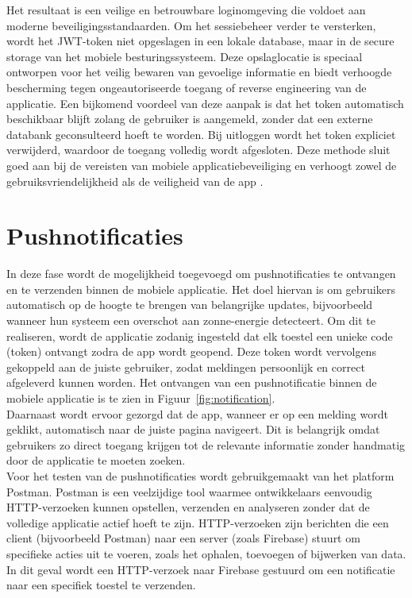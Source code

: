 Het resultaat is een veilige en betrouwbare loginomgeving die voldoet aan moderne beveiligingsstandaarden. Om het sessiebeheer verder te versterken, wordt het JWT-token niet opgeslagen in een lokale database, maar in de secure storage van het mobiele besturingssysteem. Deze opslaglocatie is speciaal ontworpen voor het veilig bewaren van gevoelige informatie en biedt verhoogde bescherming tegen ongeautoriseerde toegang of reverse engineering van de applicatie. Een bijkomend voordeel van deze aanpak is dat het token automatisch beschikbaar blijft zolang de gebruiker is aangemeld, zonder dat een externe databank geconsulteerd hoeft te worden. Bij uitloggen wordt het token expliciet verwijderd, waardoor de toegang volledig wordt afgesloten. Deze methode sluit goed aan bij de vereisten van mobiele applicatiebeveiliging en verhoogt zowel de gebruiksvriendelijkheid als de veiligheid van de app \autocite{Jurisons2024, Chinnasamy2025}.


\section{Pushnotificaties}

In deze fase wordt de mogelijkheid toegevoegd om pushnotificaties te ontvangen en te verzenden binnen de mobiele applicatie. Het doel hiervan is om gebruikers automatisch op de hoogte te brengen van belangrijke updates, bijvoorbeeld wanneer hun systeem een overschot aan zonne-energie detecteert. Om dit te realiseren, wordt de applicatie zodanig ingesteld dat elk toestel een unieke code (token) ontvangt zodra de app wordt geopend. Deze token wordt vervolgens gekoppeld aan de juiste gebruiker, zodat meldingen persoonlijk en correct afgeleverd kunnen worden. Het ontvangen van een pushnotificatie binnen de mobiele applicatie is te zien in Figuur~\ref{fig:notification}.\\

Daarnaast wordt ervoor gezorgd dat de app, wanneer er op een melding wordt geklikt, automatisch naar de juiste pagina navigeert. Dit is belangrijk omdat gebruikers zo direct toegang krijgen tot de relevante informatie zonder handmatig door de applicatie te moeten zoeken.\\

Voor het testen van de pushnotificaties wordt gebruikgemaakt van het platform Postman. Postman is een veelzijdige tool waarmee ontwikkelaars eenvoudig HTTP-verzoeken kunnen opstellen, verzenden en analyseren zonder dat de volledige applicatie actief hoeft te zijn. HTTP-verzoeken zijn berichten die een client (bijvoorbeeld Postman) naar een server (zoals Firebase) stuurt om specifieke acties uit te voeren, zoals het ophalen, toevoegen of bijwerken van data. In dit geval wordt een HTTP-verzoek naar Firebase gestuurd om een notificatie naar een specifiek toestel te verzenden. \\

